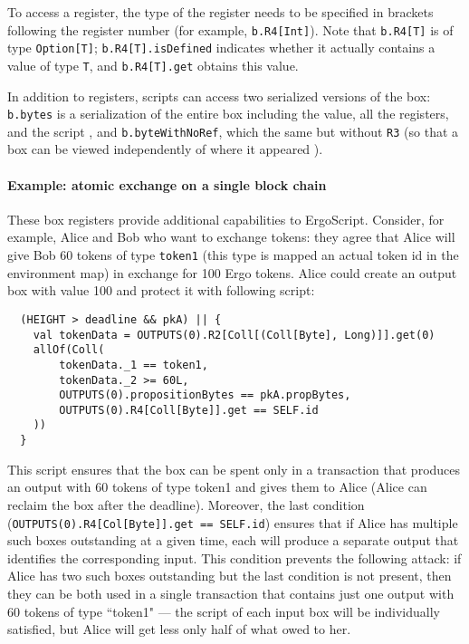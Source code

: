 \documentclass[11pt]{article}
\newcommand{\authnote}[2]{\marginpar{\parbox{\marginparwidth}{\tiny %
  \textsf{#1 {\textcolor{blue}{notes: #2}}}}}%
  \textcolor{blue}{\textbf{\dag}}}
\newcommand{\authnote}[2]{
  \textsf{#1 \textcolor{blue}{: #2}}}
\newcommand{\authnote}[2]{}
\newcommand{\lnote}[1]{{\authnote{\textcolor{orange}{Leo notes}}{#1}}}
\newcommand{\knote}[1]{{\authnote{\textcolor{green}{kushti notes}}{#1}}}
\newcommand{\langname}{ErgoScript\xspace}
\begin{document}
To access a register, the type of the register needs to be specified in brackets following the register number (for example, \texttt{b.R4[Int]}). Note that \texttt{b.R4[T]} is of type \texttt{Option[T]}; \texttt{b.R4[T].isDefined} indicates whether it actually contains a value of type \texttt{T}, and \texttt{b.R4[T].get} obtains this value.

In addition to registers, scripts can access two serialized versions of the box: \texttt{b.bytes} is a serialization of the entire box including the value, all the registers, and the script \lnote{anything else?}, and \texttt{b.byteWithNoRef}, which the same but without \texttt{R3} (so that a box can be viewed independently of where it appeared \lnote{is there a good reason someone would need this? Can we explain it here?} \knote{As output id and bytes are not predictable before spending transaction is generated, if a box is willing to require spending transaction to create box w. some semantics, the only way to do it is to use box bytes cleared from transaction-specific information. A simple example of such requirement is hash(Outputs(0).bytesWithNoRef) == "0x..."}). \lnote{Are there any other box properties that scripts can access?}

\paragraph{Example: atomic exchange on a single block chain}
These box registers provide additional capabilities to \langname. Consider, for example, Alice and Bob who want to exchange tokens: they agree that  Alice will give Bob 60 tokens of type \texttt{token1} (this type is mapped an actual token id in the environment map) in exchange for 100 Ergo tokens. Alice could create an output box with value 100 and protect it with following script:

\begin{verbatim}
  (HEIGHT > deadline && pkA) || {
    val tokenData = OUTPUTS(0).R2[Coll[(Coll[Byte], Long)]].get(0)
    allOf(Coll(
        tokenData._1 == token1,
        tokenData._2 >= 60L,
        OUTPUTS(0).propositionBytes == pkA.propBytes,
        OUTPUTS(0).R4[Coll[Byte]].get == SELF.id
    ))
  }
\end{verbatim}


This script ensures that the box can be spent only in a transaction that produces an output with 60 tokens of type token1 and gives them to Alice (Alice can reclaim the box after the deadline). 
Moreover, the last condition (\texttt{OUTPUTS(0).R4[Col[Byte]].get == SELF.id}) ensures that if Alice has multiple such boxes outstanding at a given time, each will produce a separate output that identifies the corresponding input. This condition prevents the following attack: if Alice has two such boxes outstanding but the last condition is not present, then they can be both used in a single transaction that contains just one output with 60 tokens of type ``token1" --- the script of each input box will be individually satisfied, but Alice will get less only half of what owed to her.
\end{document}
